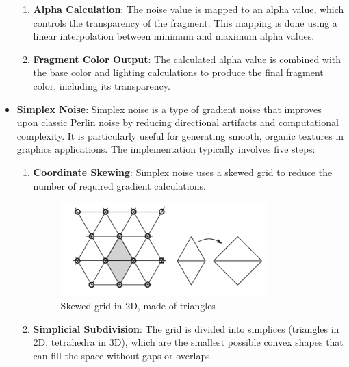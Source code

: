 \documentclass[12pt]{article}
\begin{document}
\begin{itemize}
\begin {enumerate}
        \item \textbf{Alpha Calculation}:
        \newline
        The noise value is mapped to an alpha value, which controls the transparency of the fragment. This mapping is done using a linear interpolation between minimum and maximum alpha values.

        \item \textbf{Fragment Color Output}:
        \newline
        The calculated alpha value is combined with the base color and lighting calculations to produce the final fragment color, including its transparency.
    \end{enumerate}

    \item \textbf{Simplex Noise}:
    \newline
    Simplex noise is a type of gradient noise that improves upon classic Perlin noise by reducing directional artifacts and computational complexity. 
    It is particularly useful for generating smooth, organic textures in graphics applications.
    The implementation typically involves five steps:

    \begin {enumerate}  
        \item \textbf{Coordinate Skewing}:
        \newline
        Simplex noise uses a skewed grid to reduce the number of required gradient calculations.

        \begin{figure}[H]
            \centering
            \includegraphics[width=0.8\textwidth]{Images/simplexGrid.png}
            \caption{Skewed grid in 2D, made of triangles}
        \end{figure}

        \item \textbf{Simplicial Subdivision}:
        \newline
        The grid is divided into simplices (triangles in 2D, tetrahedra in 3D), which are the smallest possible convex shapes that can fill the space without gaps or overlaps.


\end{enumerate}
\end{itemize}
\end{document}
